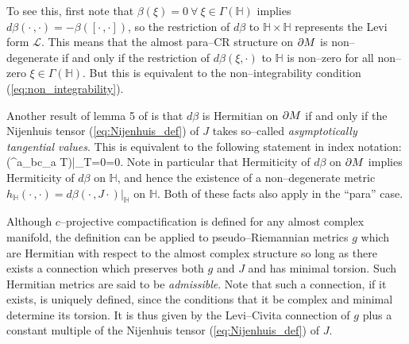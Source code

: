 To see this, first note that $\beta(\xi)=0\ \forall\ \xi\in\Gamma( \mathbb{H} )$ implies $d\beta(\cdot\,,\cdot)=-\beta([\cdot\,,\cdot])$, so the restriction of $d\beta$ to $ \mathbb{H} \times \mathbb{H} $ represents the Levi form $\mathcal{L}$. This means that the almost para--CR structure on $\partial M$ is non--degenerate if and only if the restriction of $d\beta(\xi,\cdot)$ to $ \mathbb{H} $ is non--zero for all non--zero $\xi\in\Gamma( \mathbb{H} )$. But this is equivalent to the non--integrability condition (\ref{eq:non_integrability}).


Another result of lemma 5 of \cite{CG} is that $d\beta$ is Hermitian on $\partial M$ if and only if the Nijenhuis tensor (\ref{eq:Nijenhuis_def}) of $J$ takes so--called \textit{asymptotically tangential values}. This is equivalent to the following statement in index notation:
\be
\label{Nijenhuis_condition}
\Big({^{a}}_{bc}\nabla_a T\Big)\Big|_{T=0}=0.  \ee
Note in particular that Hermiticity of $d\beta$ on $\partial M$ implies Hermiticity of $d\beta$ on $ \mathbb{H} $, and hence the existence of a non--degenerate metric $h_\mathbb{H}(\cdot\,,\cdot)=d\beta(\cdot\,,J\cdot)|_ \mathbb{H} $ on $ \mathbb{H} $. Both of these facts also apply in the ``para'' case.

Although $c$--projective compactification is defined for any almost complex manifold, the definition can be applied to pseudo--Riemannian metrics $g$ which are Hermitian with respect to the almost complex structure so long as there exists a connection which preserves both $g$ and $J$ and has minimal torsion. Such Hermitian metrics are said to be \textit{admissible}.  Note that such a connection, if it exists, is uniquely defined, since the conditions that it be complex and minimal determine its torsion. It is thus given by the Levi--Civita connection of $g$ plus a constant multiple of the Nijenhuis tensor (\ref{eq:Nijenhuis_def}) of $J$.

